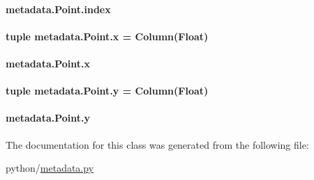 \hypertarget{classmetadata_1_1Point_a0d937f32b0ac686d9b38e3c186240443}{
\paragraph[{index}]{\setlength{\rightskip}{0pt plus 5cm}metadata.\-Point.\-index}}\label{classmetadata_1_1Point_a0d937f32b0ac686d9b38e3c186240443}
\hypertarget{classmetadata_1_1Point_a7ef9864387912af9e0ff5fe4f19ac45e}{
\paragraph[{x}]{\setlength{\rightskip}{0pt plus 5cm}tuple metadata.\-Point.\-x = Column(Float)\hspace{0.3cm}{\ttfamily [static]}}}\label{classmetadata_1_1Point_a7ef9864387912af9e0ff5fe4f19ac45e}
\hypertarget{classmetadata_1_1Point_a6230a3f60e40936748114812a7395feb}{
\paragraph[{x}]{\setlength{\rightskip}{0pt plus 5cm}metadata.\-Point.\-x}}\label{classmetadata_1_1Point_a6230a3f60e40936748114812a7395feb}
\hypertarget{classmetadata_1_1Point_a88fd89923cd8eaa8104eb079eba80b85}{
\paragraph[{y}]{\setlength{\rightskip}{0pt plus 5cm}tuple metadata.\-Point.\-y = Column(Float)\hspace{0.3cm}{\ttfamily [static]}}}\label{classmetadata_1_1Point_a88fd89923cd8eaa8104eb079eba80b85}
\hypertarget{classmetadata_1_1Point_ab7539f5008fbb1bba9517dae88ef825d}{
\paragraph[{y}]{\setlength{\rightskip}{0pt plus 5cm}metadata.\-Point.\-y}}\label{classmetadata_1_1Point_ab7539f5008fbb1bba9517dae88ef825d}


The documentation for this class was generated from the following file\-:\begin{DoxyCompactItemize}
\item 
python/\hyperlink{metadata_8py}{metadata.\-py}\end{DoxyCompactItemize}
